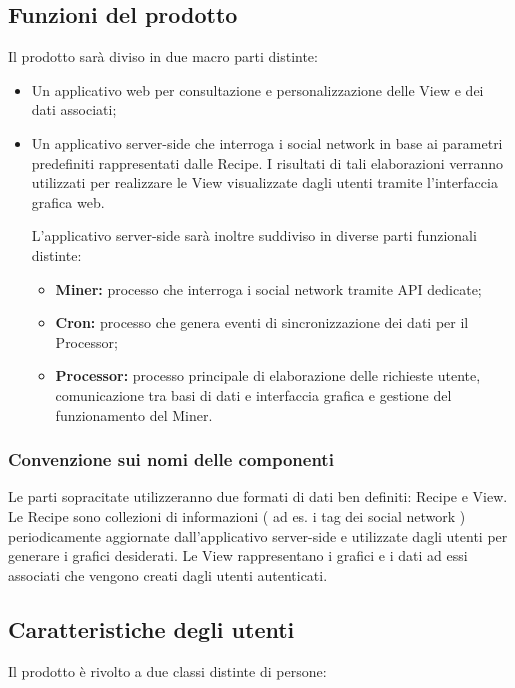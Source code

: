 \subsection{Funzioni del prodotto}
Il prodotto sarà diviso in due macro parti distinte:

\begin{itemize}
\item Un applicativo web per consultazione e personalizzazione delle View\gloss{} e dei dati associati;
\item Un applicativo server-side che interroga i social network in base ai parametri predefiniti rappresentati dalle Recipe\gloss{}. I risultati di tali elaborazioni verranno utilizzati per realizzare le View\gloss{} visualizzate dagli utenti tramite l'interfaccia grafica web.

L'applicativo server-side sarà inoltre suddiviso in diverse parti funzionali distinte:
\begin{itemize}
\item \textbf{Miner\gloss{}:} processo che interroga i social network tramite API\gloss{} dedicate;
\item \textbf{Cron\gloss{}:} processo che genera eventi di sincronizzazione dei dati per il Processor\gloss{};
\item \textbf{Processor\gloss{}:} processo principale di elaborazione delle richieste utente, comunicazione tra basi di dati e interfaccia grafica e gestione del funzionamento del Miner\gloss{}.
\end{itemize}
\end{itemize}

\subsubsection{Convenzione sui nomi delle componenti}
Le parti sopracitate utilizzeranno due formati di dati ben definiti: Recipe\gloss{} e View\gloss{}.
Le Recipe\gloss{} sono collezioni di informazioni ( ad es. i tag dei social network ) periodicamente aggiornate dall'applicativo server-side e utilizzate dagli utenti per generare i grafici desiderati.
Le View\gloss{} rappresentano i grafici e i dati ad essi associati che vengono creati dagli utenti autenticati.

\subsection{Caratteristiche degli utenti}
Il prodotto è rivolto a due classi distinte di persone:

